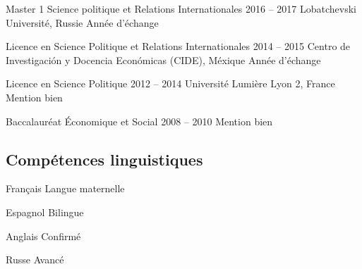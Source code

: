 \documentclass[30pt, french]{tccv}
\begin{document}
\begin{upshape}
\begin{education}
\vspace{0.5cm}
\item[Master 1 Science politique et Relations Internationales]{2016 -- 2017}
     {Lobatchevski Université, Russie}
     {Année d’échange}


\vspace{0.5cm}
\item[Licence en Science Politique et Relations Internationales]{2014 -- 2015}
     {Centro de Investigación y Docencia Económicas (CIDE), Méxique}
     {Année d’échange}

     
\vspace{0.5cm}    
\item[Licence en Science Politique ]{2012 -- 2014}
     {Université Lumière Lyon 2, France}
     {Mention bien}

     
\vspace{0.5cm}
\item[Baccalauréat Économique et Social]{2008 -- 2010}
     {}
     {Mention bien}


\end{education}


%
%


\begin{competence}


\section{Compétences linguistiques}
\begin{factlist}
\item{Français} {Langue maternelle}	
\item{Espagnol} {Bilingue}	
\item{Anglais} {Confirmé}	
\item{Russe} {Avancé}
\end{factlist}


\vspace{0.5cm}

\end{competence}
\end{upshape}
\end{document}
